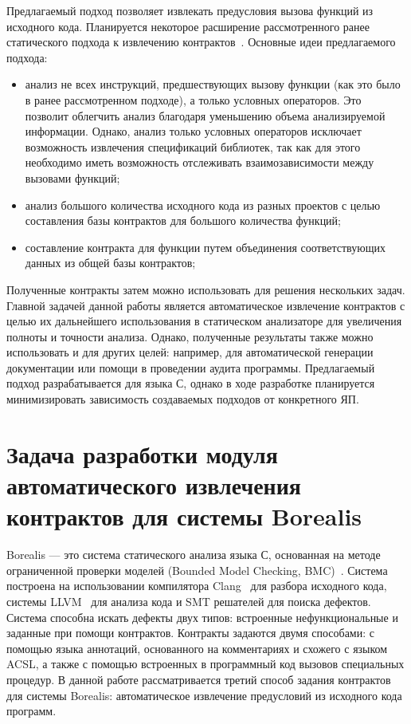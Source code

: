 Предлагаемый подход позволяет извлекать предусловия вызова функций из исходного кода. Планируется некоторое расширение рассмотренного ранее статического подхода к извлечению контрактов~\cite{staticPredicateMining}. Основные идеи предлагаемого подхода:
\begin{itemize}
\item анализ не всех инструкций, предшествующих вызову функции (как это было в ранее рассмотренном подходе), а только условных операторов. Это позволит облегчить анализ благодаря уменьшению объема анализируемой информации. Однако, анализ только условных операторов исключает возможность извлечения спецификаций библиотек, так как для этого необходимо иметь возможность отслеживать взаимозависимости между вызовами функций;
\item анализ большого количества исходного кода из разных проектов с целью составления базы контрактов для большого количества функций;
\item составление контракта для функции путем объединения соответствующих данных из общей базы контрактов;
\end{itemize}

Полученные контракты затем можно использовать для решения нескольких задач. Главной задачей данной работы является автоматическое извлечение контрактов с целью их дальнейшего использования в статическом анализаторе для увеличения полноты и точности анализа. Однако, полученные результаты также можно использовать и для других целей: например, для автоматической генерации документации или помощи в проведении аудита программы. Предлагаемый подход разрабатывается для языка С, однако в ходе разработке планируется минимизировать зависимость создаваемых подходов от конкретного ЯП.

\section{Задача разработки модуля автоматического извлечения контрактов для системы Borealis}
Borealis --- это система статического анализа языка С, основанная на методе ограниченной проверки моделей (Bounded Model Checking, BMC)~\cite{bmc}. Система построена на использовании компилятора Clang~\cite{clang} для разбора исходного кода, системы LLVM~\cite{llvm} для анализа кода и SMT решателей для поиска дефектов. Система способна искать дефекты двух типов: встроенные нефункциональные и заданные при помощи контрактов. Контракты задаются двумя способами: с помощью языка аннотаций, основанного на комментариях и схожего с языком ACSL, а также с помощью встроенных в программный код вызовов специальных процедур. В данной работе рассматривается третий способ задания контрактов для системы Borealis: автоматическое извлечение предусловий из исходного кода программ.

